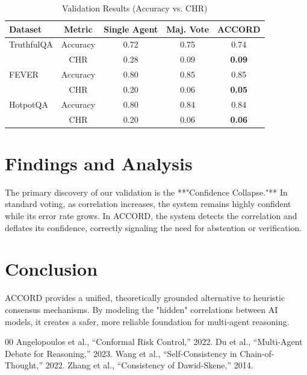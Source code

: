 \documentclass[conference]{IEEEtran}
\begin{document}
\begin{table}[htbp]
\caption{Validation Results (Accuracy vs. CHR)}
\label{tab:validation}
\begin{center}
\begin{tabular}{lcccc}
\toprule
Dataset & Metric & Single Agent & Maj. Vote & \textbf{ACCORD} \\
\midrule
TruthfulQA & Accuracy & 0.72 & 0.75 & 0.74 \\
           & CHR      & 0.28 & 0.09 & \textbf{0.09} \\
\midrule
FEVER      & Accuracy & 0.80 & 0.85 & 0.85 \\
           & CHR      & 0.20 & 0.06 & \textbf{0.05} \\
\midrule
HotpotQA   & Accuracy & 0.80 & 0.84 & 0.84 \\
           & CHR      & 0.20 & 0.06 & \textbf{0.06} \\
\bottomrule
\end{tabular}
\end{center}
\end{table}

\section{Findings and Analysis}
The primary discovery of our validation is the **"Confidence Collapse."** In standard voting, as correlation increases, the system remains highly confident while its error rate grows. In ACCORD, the system detects the correlation and deflates its confidence, correctly signaling the need for abstention or verification.

\section{Conclusion}
ACCORD provides a unified, theoretically grounded alternative to heuristic consensus mechanisms. By modeling the "hidden" correlations between AI models, it creates a safer, more reliable foundation for multi-agent reasoning.

\begin{thebibliography}{00}
 Angelopoulos et al., ``Conformal Risk Control,'' 2022.
 Du et al., ``Multi-Agent Debate for Reasoning,'' 2023.
 Wang et al., ``Self-Consistency in Chain-of-Thought,'' 2022.
 Zhang et al., ``Consistency of Dawid-Skene,'' 2014.
\end{thebibliography}
\end{document}
